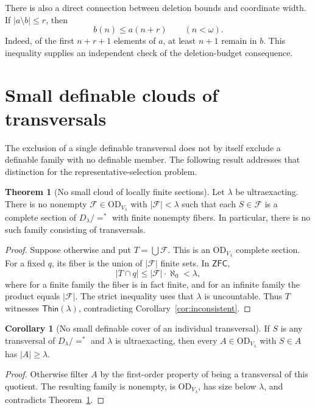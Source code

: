 \documentclass[11pt,letterpaper]{article}
\theoremstyle{definition}
\newtheorem{theorem}[definition]{Theorem}
\newtheorem{corollary}[definition]{Corollary}
\newcommand{\ZFC}{\mathsf{ZFC}}
\newcommand{\OD}{\mathrm{OD}}
\numberwithin{equation}{section}
\newcommand{\Thin}{\mathsf{Thin}}
\begin{document}
There is also a direct connection between deletion bounds and coordinate width. If $|a\setminus b|\le r$, then
\begin{equation}
b(n)\le a(n+r)\qquad(n<\omega).\label{eq:deletion-bound}
\end{equation}
Indeed, of the first $n+r+1$ elements of $a$, at least $n+1$ remain in $b$. This inequality supplies an independent check of the deletion-budget consequence.

\section{Small definable clouds of transversals}\label{sec:clouds}

The exclusion of a single definable transversal does not by itself exclude a definable family with no definable member. The following result addresses that distinction for the representative-selection problem.

\begin{theorem}[No small cloud of locally finite sections]\label{thm:clouds}
Let $\lambda$ be ultraexacting. There is no nonempty $\mathcal F\in\OD_{V_\lambda}$ with $|\mathcal F|<\lambda$ such that each $S\in\mathcal F$ is a complete section of $D_\lambda/{=^{*}}$ with finite nonempty fibers. In particular, there is no such family consisting of transversals.
\end{theorem}
\begin{proof}
Suppose otherwise and put $T=\bigcup\mathcal F$. This is an $\OD_{V_\lambda}$ complete section. For a fixed $q$, its fiber is the union of $|\mathcal F|$ finite sets. In $\ZFC$,
\[
|T\cap q|\le |\mathcal F|\cdot\aleph_0<\lambda,
\]
where for a finite family the fiber is in fact finite, and for an infinite family the product equals $|\mathcal F|$. The strict inequality uses that $\lambda$ is uncountable. Thus $T$ witnesses $\Thin(\lambda)$, contradicting Corollary~\ref{cor:inconsistent}.
\end{proof}

\begin{corollary}[No small definable cover of an individual transversal]\label{cor:cloud-cover}
If $S$ is any transversal of $D_\lambda/{=^{*}}$ and $\lambda$ is ultraexacting, then every $A\in\OD_{V_\lambda}$ with $S\in A$ has $|A|\ge\lambda$.
\end{corollary}
\begin{proof}
Otherwise filter $A$ by the first-order property of being a transversal of this quotient. The resulting family is nonempty, is $\OD_{V_\lambda}$, has size below $\lambda$, and contradicts Theorem~\ref{thm:clouds}.
\end{proof}
\end{document}
